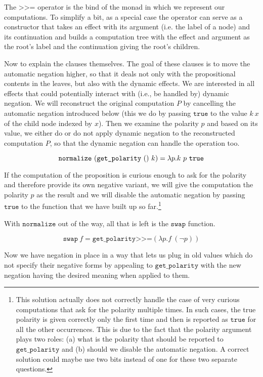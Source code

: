 \documentclass[a4paper,11pt,DIV=12]{scrartcl}
\newcommand{\hsbind}{\mathbin{\texttt{>>=}}}
\begin{document}
The $\hsbind$ operator is the bind of the monad in which we represent our
computations. To simplify a bit, as a special case the operator can serve
as a constructor that takes an effect with its argument (i.e. the label of
a node) and its continuation and builds a computation tree with the effect
and argument as the root's label and the continuation giving the root's
children.

Now to explain the clauses themselves. The goal of these clauses is to move
the automatic negation higher, so that it deals not only with the
propositional contents in the leaves, but also with the dynamic effects. We
are interested in all effects that could potentially interact with (i.e.,
be handled by) dynamic negation. We will reconstruct the original
computation $P$ by cancelling the automatic negation introduced below (this
we do by passing $\texttt{true}$ to the value $k\ x$ of the child node
indexed by $x$). Then we examine the polarity $p$ and based on its value,
we either do or do not apply dynamic negation to the reconstructed
computation $P$, so that the dynamic negation can handle the operation too.

$$
\texttt{normalize}\ (\texttt{get\_polarity}\ ()\ k) = \lambda p. k\ p\ \texttt{true} \\
$$

If the computation of the proposition is curious enough to ask for the
polarity and therefore provide its own negative variant, we will give the
computation the polarity $p$ as the result and we will disable the
automatic negation by passing $\texttt{true}$ to the function that we have
built up so far.\footnote{This solution actually does not correctly handle
  the case of very curious computations that ask for the polarity multiple
  times. In such cases, the true polarity is given correctly only the first
  time and then is reported as $\texttt{true}$ for all the other
  occurrences. This is due to the fact that the polarity argument plays two
  roles: (a) what is the polarity that should be reported to
  $\texttt{get\_polarity}$ and (b) should we disable the automatic
  negation. A correct solution could maybe use two bits instead of one for
  these two separate questions.}

With $\texttt{normalize}$ out of the way, all that is left is the
$\texttt{swap}$ function.

$$
\texttt{swap}\ f = \texttt{get\_polarity} \hsbind (\lambda p. f\ (\lnot p))
$$

Now we have negation in place in a way that lets us plug in old values
which do not specify their negative forms by appealing to
$\texttt{get\_polarity}$ with the new negation having the desired meaning
when applied to them.
\end{document}
